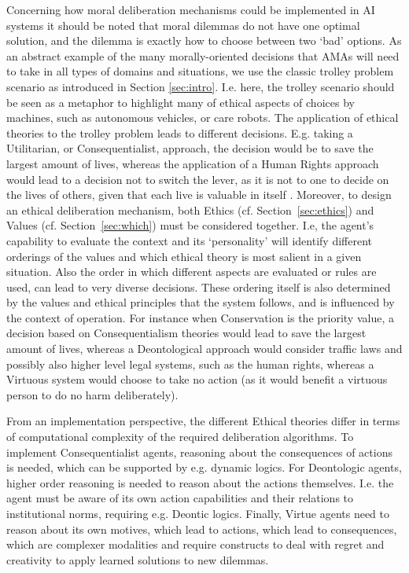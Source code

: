 \documentclass[twocolumn]{article}
\begin{document}
Concerning how moral deliberation mechanisms could be implemented in AI systems it should be noted that moral dilemmas do not have one optimal solution, and the dilemma is exactly how to choose between two `bad' options. As an abstract example of the many morally-oriented decisions that AMAs will need to take in all types of domains and situations, we use the classic trolley problem scenario as introduced in Section \ref{sec:intro}. %
I.e. here, the trolley scenario should be seen as a 
metaphor to highlight many of ethical aspects of choices by machines, such as autonomous vehicles, or care robots. 
The application of ethical theories to the trolley problem leads to different decisions. E.g. taking a Utilitarian, or Consequentialist, approach, the decision would be to save the largest amount of lives, whereas the application of a Human Rights approach would lead to a decision not to switch the lever, as it is not to one to decide on the lives of others, given that each live is valuable in itself \cite{PAPA:PAPA017}. 
Moreover, to design an ethical deliberation mechanism, both Ethics (cf. Section~\ref{sec:ethics}) and Values (cf. Section~\ref{sec:which}) must be considered together. I.e, the agent's capability to evaluate the context and its `personality' will identify different orderings of the values and which ethical theory is most salient in a given situation. Also the order in which different aspects are evaluated or rules are used, can lead to very diverse decisions. These ordering itself is also determined by the values and ethical principles that the system follows, and is influenced by the context of operation. %
For instance when Conservation is the priority value, a decision based on Consequentialism theories would lead to save the largest amount of lives, whereas a Deontological approach would consider traffic laws and possibly also higher level legal systems, such as the human rights, whereas a Virtuous system would choose to take no action (as it would benefit a virtuous person to do no harm deliberately). 

From an implementation perspective, 
the different Ethical theories differ in terms of computational complexity of the required deliberation algorithms. To implement Consequentialist agents, reasoning about the consequences of actions is needed, which can be supported by e.g. dynamic logics. For Deontologic agents, higher order reasoning is needed to reason about the actions themselves. I.e. the agent must be aware of its own action capabilities and their relations to institutional norms, requiring e.g. Deontic logics. Finally, Virtue agents need to reason about its own motives, which lead to actions, which lead to consequences, which are complexer modalities and require constructs to deal with regret and creativity to apply learned solutions to new dilemmas. %
\end{document}
